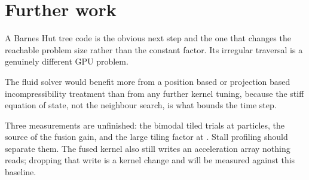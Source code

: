 \section{Further work}

A Barnes Hut tree code is the obvious next step and the one that changes the
reachable problem size rather than the constant factor. Its irregular traversal
is a genuinely different GPU problem.

The fluid solver would benefit more from a position based or projection based
incompressibility treatment than from any further kernel tuning, because the
stiff equation of state, not the neighbour search, is what bounds the time step.

Three measurements are unfinished: the bimodal tiled trials at \LadderMaxN{} particles, the
source of the fusion gain, and the large tiling factor at \LadderMinN{}. Stall profiling
should separate them. The fused kernel also still writes an acceleration array nothing
reads; dropping that write is a kernel change and will be measured against this baseline.
